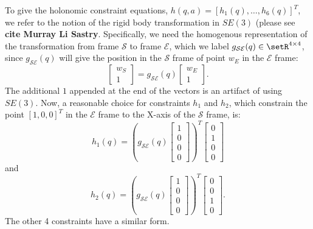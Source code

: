 \documentclass[letterpaper, 10pt, conference]{ieeeconf}
\begin{document}
To give the holonomic constraint equations, $h(q,a) = [h_1(q),\ldots,h_6(q)]^T$, we refer to the notion of the rigid body transformation in $SE(3)$ (please see \textbf{cite Murray Li Sastry}.  Specifically, we need the homogenous representation of the transformation from frame $\mathcal{S}$ to frame $\mathcal{E}$, which we label $g_{\mathcal{S}\mathcal{E}}(q)\in\setR^{4\times 4}$, since $g_{\mathcal{S}\mathcal{E}}(q)$ will give the position in the $\mathcal{S}$ frame of point $w_E$ in the $\mathcal{E}$ frame:
\[
\left[\begin{array}{c} w_S \\ 1 \end{array}\right] = g_{\mathcal{S}\mathcal{E}}(q) \left[\begin{array}{c} w_E \\ 1 \end{array}\right].
\]
The additional $1$ appended at the end of the vectors is an artifact of using $SE(3)$.  Now, a reasonable choice for constraints $h_1$ and $h_2$, which constrain the point $[1, 0, 0]^T$ in the $\mathcal{E}$ frame to the X-axis of the $\mathcal{S}$ frame, is:
\begin{equation}
h_1(q) = \left(g_{\mathcal{S}\mathcal{E}}(q)  \left[\begin{array}{c} 1 \\ 0 \\ 0 \\ 0 \end{array}\right]\right)^T\left[\begin{array}{c} 0 \\ 1 \\ 0 \\ 0 \end{array}\right] 
\label{eq-h1}
\end{equation}
and
\begin{equation}
h_2(q) = \left(g_{\mathcal{S}\mathcal{E}}(q)  \left[\begin{array}{c} 1 \\ 0 \\ 0 \\ 0 \end{array}\right]\right)^T \left[\begin{array}{c} 0 \\ 0 \\ 1 \\ 0 \end{array}\right].
\label{eq-h2}
\end{equation}
The other 4 constraints have a similar form.  
\end{document}
